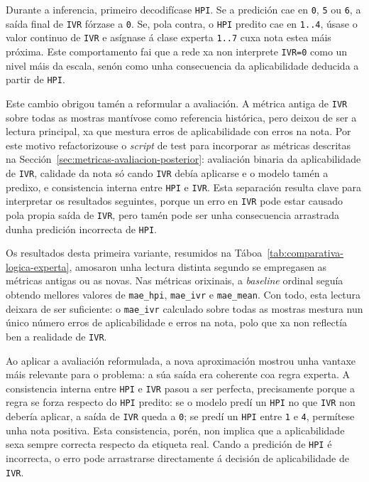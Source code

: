 Durante a inferencia, primeiro decodifícase \texttt{HPI}. Se a predición cae en \texttt{0},
\texttt{5} ou \texttt{6}, a saída final de \texttt{IVR} fórzase a \texttt{0}. Se, pola contra, o
\texttt{HPI} predito cae en \texttt{1..4}, úsase o valor continuo de \texttt{IVR} e asígnase á
clase experta \texttt{1..7} cuxa nota estea máis próxima. Este comportamento fai que a rede xa
non interprete \texttt{IVR=0} como un nivel máis da escala, senón como unha consecuencia da
aplicabilidade deducida a partir de \texttt{HPI}.

Este cambio obrigou tamén a reformular a avaliación. A métrica antiga de \texttt{IVR} sobre todas
as mostras mantívose como referencia histórica, pero deixou de ser a lectura principal, xa que
mestura erros de aplicabilidade con erros na nota. Por este motivo refactorizouse o \textit{script}
de test para incorporar as métricas descritas na
Sección~\ref{sec:metricas-avaliacion-posterior}: avaliación binaria da aplicabilidade de
\texttt{IVR}, calidade da nota só cando \texttt{IVR} debía aplicarse e o modelo tamén a predixo, e
consistencia interna entre \texttt{HPI} e \texttt{IVR}. Esta separación resulta clave para interpretar
os resultados seguintes, porque un erro en \texttt{IVR} pode estar causado pola propia saída de
\texttt{IVR}, pero tamén pode ser unha consecuencia arrastrada dunha predición incorrecta de
\texttt{HPI}.

Os resultados desta primeira variante, resumidos na Táboa~\ref{tab:comparativa-logica-experta},
amosaron unha lectura distinta segundo se empregasen as métricas antigas ou as novas. Nas métricas
orixinais, a \textit{baseline} ordinal seguía obtendo mellores valores de \texttt{mae\_hpi},
\texttt{mae\_ivr} e \texttt{mae\_mean}. Con todo, esta lectura deixara de ser suficiente: o
\texttt{mae\_ivr} calculado sobre todas as mostras mestura nun único número erros de
aplicabilidade e erros na nota, polo que xa non reflectía ben a realidade de \texttt{IVR}.

Ao aplicar a avaliación reformulada, a nova aproximación mostrou unha vantaxe máis relevante para o
problema: a súa saída era coherente coa regra experta. A consistencia interna entre \texttt{HPI} e
\texttt{IVR} pasou a ser perfecta, precisamente porque a regra se forza respecto do \texttt{HPI}
predito: se o modelo predí un \texttt{HPI} no que \texttt{IVR} non debería aplicar, a saída de
\texttt{IVR} queda a \texttt{0}; se predí un \texttt{HPI} entre \texttt{1} e \texttt{4}, permítese
unha nota positiva. Esta consistencia, porén, non implica que a aplicabilidade sexa sempre correcta
respecto da etiqueta real. Cando a predición de \texttt{HPI} é incorrecta, o erro pode arrastrarse
directamente á decisión de aplicabilidade de \texttt{IVR}.

